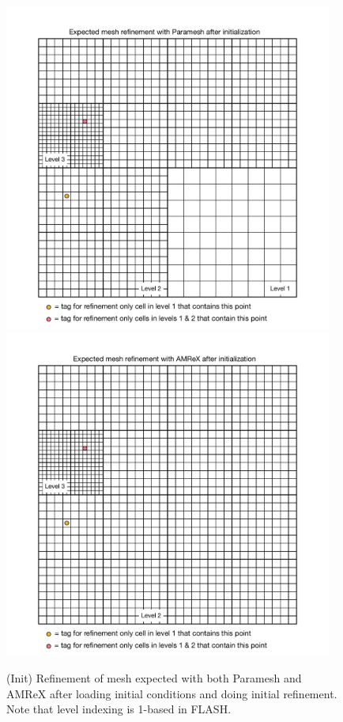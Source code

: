 \documentclass[12pt,letterpaper]{article}
\begin{document}
\begin{figure}[!hp]
\begin{center}
\includegraphics[width=4.25in]{TestRefine_Init_Paramesh.pdf}\\
\includegraphics[width=4.25in]{TestRefine_Init_AMReX.pdf}
\caption{(Init) Refinement of mesh expected with both Paramesh and AMReX after loading
initial conditions and doing initial refinement.  Note that level indexing is
1-based in FLASH.}
\end{center}
\end{figure}
\end{document}

